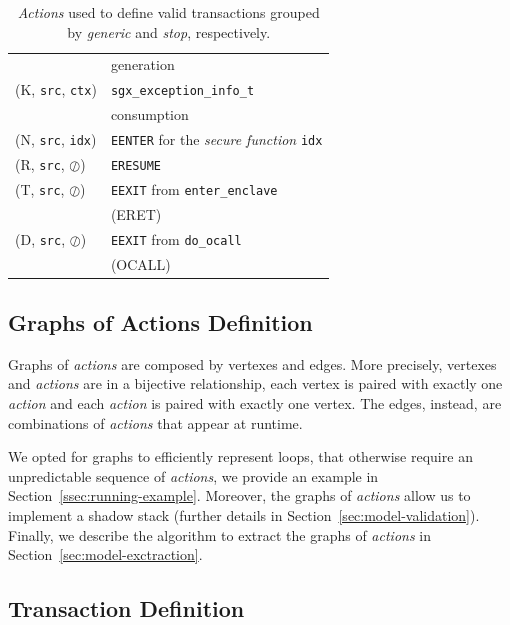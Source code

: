 \begin{table}[t]
\begin{tabular}{ll}
		&  generation \\ 
		(K, \texttt{src}, \texttt{ctx}) & \texttt{sgx\_exception\_info\_t} \\
		& consumption \\ 
		(N, \texttt{src}, \texttt{idx}) & \texttt{EENTER} for the \emph{secure 
			function} \texttt{idx} \\ 
		(R, \texttt{src}, $\oslash$) & \texttt{ERESUME} \\ 
		(T, \texttt{src}, $\oslash$) & \texttt{EEXIT} from 
		\texttt{enter\_enclave} \\
		& (ERET) \\ 
		(D, \texttt{src}, $\oslash$) & \texttt{EEXIT} from \texttt{do\_ocall} \\
		& (OCALL) \\ 
		\bottomrule
	\end{tabular} 
	\caption{\emph{Actions} used to define valid transactions grouped by 
		\emph{generic} and \emph{stop}, respectively.}
	\label{tbl:actionss}
\end{table}


\subsection{Graphs of Actions Definition}
\label{ssec:graph-of-action}

Graphs of \emph{actions} are composed by vertexes and edges.
More precisely, vertexes and \emph{actions} are in a bijective relationship, 
\ie each vertex is paired with exactly one \emph{action} and each \emph{action}
is paired with exactly one vertex.
The edges, instead, are combinations of \emph{actions} that appear at 
runtime.

We opted for graphs to efficiently represent loops, that otherwise require
an unpredictable sequence of \emph{actions}, we provide an example in
Section~\ref{ssec:running-example}.
Moreover, the graphs of \emph{actions} allow us to implement a shadow stack  
(further details in Section~\ref{sec:model-validation}).
Finally, we describe the algorithm to extract the graphs of \emph{actions} in 
Section~\ref{sec:model-exctraction}.



\subsection{Transaction Definition}
\label{ssec:transaption-model}

